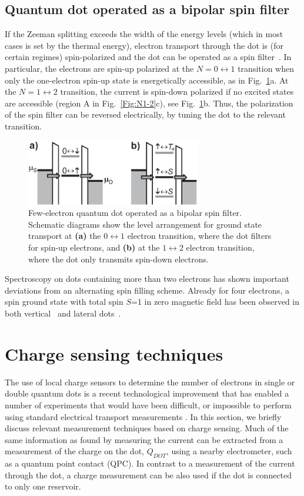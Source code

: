 \documentclass[rmp,twocolumn,aps]{revtex4}
\begin{document}
\subsection{Quantum dot operated as a bipolar spin filter}
If the Zeeman splitting exceeds the width of the energy levels
(which in most cases is set by the thermal energy), electron
transport through the dot is (for certain regimes) spin-polarized
and the dot can be operated as a spin
filter~\cite{RecherPRL2000,HansonPRB2004}. In particular, the
electrons are spin-up polarized at the $N=0\leftrightarrow1$
transition when only the one-electron spin-up state is
energetically accessible, as in Fig.~\ref{fig:spinfilter}a. At the
$N=1\leftrightarrow2$ transition, the current is spin-down
polarized if no excited states are accessible (region A in
Fig.~\ref{Fig:N1-2}c), see Fig.~\ref{fig:spinfilter}b. Thus, the
polarization of the spin filter can be reversed electrically, by
tuning the dot to the relevant transition.

\begin{figure}[htb]
\includegraphics[width=3in]{hanson_fig10.eps}
\caption{Few-electron quantum dot operated as a bipolar spin
filter. Schematic diagrams show the level arrangement for ground
state transport at \textbf{(a)} the $0\leftrightarrow1$ electron
transition, where the dot filters for spin-up electrons, and
\textbf{(b)} at the $1\leftrightarrow2  $ electron transition,
where the dot only transmits spin-down electrons.}
\label{fig:spinfilter}
\end{figure}


Spectroscopy on dots containing more than two electrons has shown
important deviations from an alternating spin filling scheme.
Already for four electrons, a spin ground state with total spin
$S$=1 in zero magnetic field has been observed in both
vertical~\cite{kouwenhoven01} and lateral dots~\cite{BeverenNJP2005}.

\section{Charge sensing techniques}
\label{Section:ChargeSensing} \label{QPC} The use of local charge
sensors to determine the number of electrons in single or double
quantum dots is a recent technological improvement that has
enabled a number of experiments that would have been difficult, or
impossible to perform using standard electrical transport
measurements \cite{FieldPRL93}. In this section, we briefly
discuss relevant measurement techniques based on charge sensing.
Much of the same information as found by measuring the current can
be extracted from a measurement of the charge on the dot,
$Q_{DOT}$, using a nearby
electrometer, such as a quantum point contact (QPC).
In contrast to a measurement of the current through the dot, a charge
measurement can be also used if the dot is
connected to only one reservoir.
\end{document}
